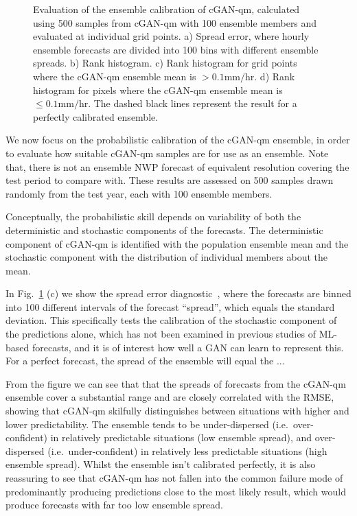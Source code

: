\documentclass{article}
\begin{document}
\begin{figure}[!ht]
     
     \caption{Evaluation of the ensemble calibration of cGAN-qm, calculated using 500 samples from cGAN-qm with 100 ensemble members and evaluated at individual grid points. a) Spread error, where hourly ensemble forecasts are divided into 100 bins with different ensemble spreads. b) Rank histogram. c) Rank histogram for grid points where the cGAN-qm ensemble mean is $>0.1\text{mm/hr}$. d) Rank histogram for pixels where the cGAN-qm ensemble mean is $\leq 0.1\text{mm/hr}$. The dashed black lines represent the result for a perfectly calibrated ensemble. }
     \label{fig:ens_calib}
\end{figure}


We now focus on the probabilistic calibration of the cGAN-qm ensemble, in order to evaluate how suitable cGAN-qm samples are for use as an ensemble. Note that, there is not an ensemble NWP forecast of equivalent resolution covering the test period to compare with. These results are assessed on 500 samples drawn randomly from the test year, each with 100 ensemble members. 

Conceptually, the probabilistic skill depends on variability of both the deterministic and stochastic components of the forecasts. The deterministic component of cGAN-qm is identified with the population ensemble mean and the stochastic component with the distribution of individual members about the mean.

In Fig.~\ref{fig:ens_calib} (c) we show the spread error diagnostic~\citep{leutbecher_ensemble_2008}, where the forecasts are binned into 100 different intervals of the forecast ``spread'', which equals the standard deviation. This specifically tests the calibration of the stochastic component of the predictions alone, which has not been examined in previous studies of ML-based forecasts, and it is of interest how well a GAN can learn to represent this. For a perfect forecast, the spread of the ensemble will equal the ...

From the figure we can see that that the spreads of forecasts from the cGAN-qm ensemble cover a substantial range and are closely correlated with the RMSE, showing that cGAN-qm skilfully distinguishes between situations with higher and lower predictability. The ensemble tends to be under-dispersed (i.e.~over-confident) in relatively predictable situations (low ensemble spread), and over-dispersed (i.e.~under-confident) in relatively less predictable situations (high ensemble spread). Whilst the ensemble isn't calibrated perfectly, it is also reassuring to see that cGAN-qm has not fallen into the common failure mode of predominantly producing predictions close to the most likely result, which would produce forecasts with far too low ensemble spread.
\end{document}
